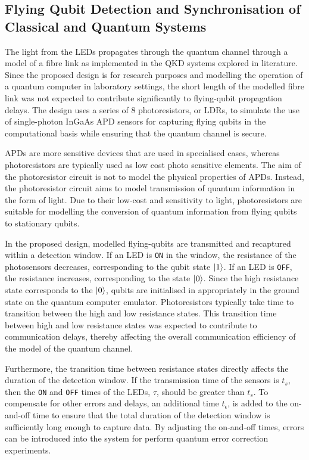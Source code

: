 \subsection{Flying Qubit Detection and Synchronisation of Classical and Quantum Systems \label{subsec:fqds-synch-requirements}}

The light from the LEDs propagates through the quantum channel through a model of a fibre link as implemented in the QKD systems explored in literature. Since the proposed design is for research purposes and modelling the operation of a quantum computer in laboratory settings, the short length of the modelled fibre link was not expected to contribute significantly to flying-qubit propagation delays. The design uses a series of 8 photoresistors, or LDRs, to simulate the use of single-photon InGaAs APD sensors for capturing flying qubits in the computational basis while ensuring that the quantum channel is secure. 

APDs are more sensitive devices that are used in specialised cases, whereas photoresistors are typically used as low cost photo sensitive elements. The aim of the photoresistor circuit is not to model the physical properties of APDs. Instead, the photoresistor circuit aims to model transmission of quantum information in the form of light. Due to their low-cost and sensitivity to light, photoresistors are suitable for modelling the conversion of quantum information from flying qubits to stationary qubits. 

In the proposed design, modelled flying-qubits are transmitted and recaptured within a detection window. If an LED is \texttt{ON} in the window, the resistance of the photosensors decreases, corresponding to the qubit state $\ket{1}$. If an LED is \texttt{OFF}, the resistance increases, corresponding to the state $\ket{0}$. Since the high resistance state corresponds to the $\ket{0}$, qubits are initialised in appropriately in the ground state on the quantum computer emulator. Photoresistors typically take time to transition between the high and low resistance states. This transition time between high and low resistance states was expected to contribute to communication delays, thereby affecting the overall communication efficiency of the model of the quantum channel. 

Furthermore, the transition time between resistance states directly affects the duration of the detection window. If the transmission time of the sensors is $t_s$, then the \texttt{ON} and \texttt{OFF} times of the LEDs, $\tau$, should be greater than $t_s$. To compensate for other errors and delays, an additional time $t_\epsilon$, is added to the on-and-off time to ensure that the total duration of the detection window is sufficiently long enough to capture data. By adjusting the on-and-off times, errors can be introduced into the system for perform quantum error correction experiments. 

